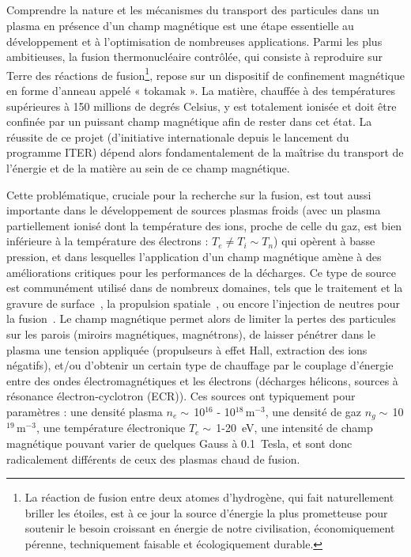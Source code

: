
\begin{refsection}

\section*{}
Comprendre la nature et les mécanismes du transport des particules dans un
plasma en présence d'un champ magnétique est une étape essentielle au
développement et à l'optimisation de nombreuses applications.
Parmi les plus ambitieuses, la fusion thermonucléaire contrôlée, qui
consiste à reproduire sur Terre des réactions de fusion\footnote{La réaction de
fusion entre deux atomes d'hydrogène, qui fait naturellement briller les
étoiles, est à ce jour la source d'énergie la plus prometteuse pour soutenir le besoin croissant en énergie de notre civilisation,
économiquement pérenne, techniquement faisable et écologiquement durable.},
repose sur un dispositif de confinement magnétique en forme d'anneau appelé « tokamak ».
La matière, chauffée à des températures supérieures à 150 millions de degrés
Celsius, y est totalement ionisée et doit être confinée par un puissant champ magnétique afin
de rester dans cet état. La réussite de ce projet (d'initiative
internationale depuis le lancement du programme ITER) dépend alors
fondamentalement de la maîtrise du transport de l'énergie et de la matière au
sein de ce champ magnétique.

Cette problématique, cruciale pour la recherche sur la fusion, est tout aussi
importante dans le développement de sources plasmas froids (avec un plasma
partiellement ionisé dont la température des ions, proche de celle du gaz,
est bien inférieure à la température des électrons : $T_e\neq T_i\sim
T_n$) qui opèrent à basse pression, et dans lesquelles l'application d'un champ
magnétique amène à des améliorations critiques pour les performances de la
décharges. Ce type de source est communément utilisé dans de
nombreux domaines, tels que le traitement et la gravure de
surface~\parencite{Lieberman}, la propulsion spatiale~\parencite{Zhurin}, ou
encore l'injection de neutres pour la fusion~\parencite{SimoninHDR}. Le champ
magnétique permet alors de limiter la pertes des particules sur les parois (miroirs magnétiques,
magnétrons), de laisser pénétrer dans le plasma une tension appliquée
(propulseurs à effet Hall, extraction des ions négatifs), et/ou d'obtenir un
certain type de chauffage par le couplage d'énergie entre des ondes
électromagnétiques et les électrons (décharges hélicons, sources à résonance
électron-cyclotron (ECR)). Ces sources ont typiquement pour paramètres : une
densité plasma $n_e\sim\,$10$^{16}$ - 10$^{18}\,$m$^{-3}$, une densité de gaz
$n_g\sim\,$10$^{19}\,$m$^{-3}$, une température électronique $T_e\sim\,$1-20~eV,
une intensité de champ magnétique pouvant varier de quelques Gauss à 0.1~Tesla,
et sont donc radicalement différents de ceux des plasmas chaud de fusion.


\end{refsection}

